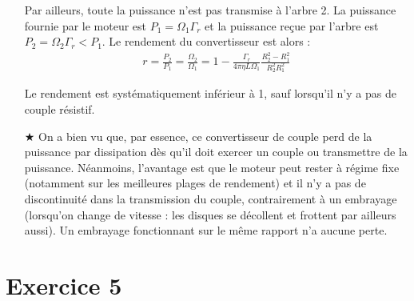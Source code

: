 \documentclass{report}
\begin{document}
\begin{itemize}
	Par ailleurs, toute la puissance n'est pas transmise à l'arbre 2. La puissance fournie par le moteur est $P_1 = \Omega_1\Gamma_r$ et la puissance reçue par l'arbre est $P_2 = \Omega_2\Gamma_r<P_1$. Le rendement du convertisseur est alors :
	\begin{align*}
		r = \frac{P_2}{P_1} = \frac{\Omega_2}{\Omega_1}=1-\frac{\Gamma_{r}}{4\pi\eta L\Omega_1}\frac{R_2^2-R_1^2}{R_2^2R_1^2}
	\end{align*}
	
	Le rendement est systématiquement inférieur à 1, sauf lorsqu'il n'y a pas de couple résistif.
	
	\item[$\bigstar$] On a bien vu que, par essence, ce convertisseur de couple perd de la puissance par dissipation dès qu'il doit exercer un couple ou transmettre de la puissance. Néanmoins, l'avantage est que le moteur peut rester à régime fixe (notamment sur les meilleures plages de rendement) et il n'y a pas de discontinuité dans la transmission du couple, contrairement à un embrayage (lorsqu'on change de vitesse : les disques se décollent et frottent par ailleurs aussi). Un embrayage fonctionnant sur le même rapport n'a aucune perte.
		
\end{itemize}

\section*{Exercice 5}
\end{document}

